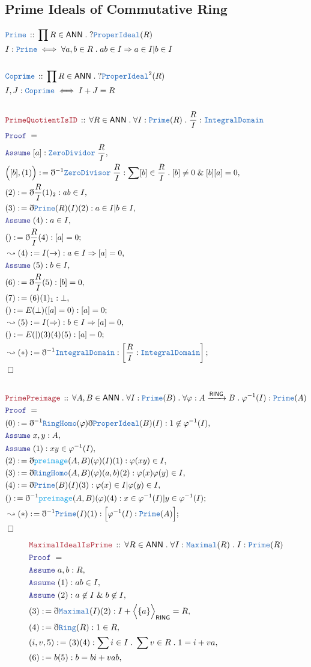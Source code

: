 \documentclass[12pt]{scrartcl}
\newcommand{\TYPE}[1]{\textcolor{NavyBlue}{\mathtt{#1}}}
\newcommand{\FUNC}[1]{\textcolor{Cerulean}{\mathtt{#1}}}
\newcommand{\LOGIC}[1]{\textcolor{Blue}{\mathtt{#1}}}
\newcommand{\THM}[1]{\textcolor{Maroon}{\mathtt{#1}}}
\renewcommand{\.}{\; . \;}
\newcommand{\de}{: \kern 0.1pc =}
\newcommand{\Theorem}[2]{& \THM{#1} \, :: \, #2 \\ & \Proof = \\ }
\newcommand{\DeclareType}[2]{& \TYPE{#1} \, :: \, #2 \\}
\newcommand{\DefineType}[3]{& #1 : \TYPE{#2} \iff #3 \\}
\newcommand{\Page}[1]{ \begin{align*} #1 \end{align*}   }
\newcommand{ \bd }{ \ByDef }
\renewcommand{\And}{\; \& \;}
\newcommand{\Say}[3]{& #1 \de #2 : #3, \\}
\newcommand{\Conclude}[3]{& #1 \de #2 : #3; \\}
\newcommand{\Derive}[3]{& \leadsto #1 \de #2 : #3, \\}
\newcommand{\DeriveConclude}[3]{& \leadsto #1 \de #2 : #3 ; \\}
\newcommand{\Assume}[2]{& \LOGIC{Assume} \; #1 : #2, \\}
\newcommand{\QED}{\; \square}
\newcommand{\EndProof}{& \QED \\}
\newcommand{\ByDef}{\eth}
\newcommand{\Proof}{\LOGIC{Proof} \; }
\newcommand{\Arrow}[1]{\xrightarrow{#1}}
\newcommand{\ID}{\TYPE{IntegralDomain}}
\newcommand{\RING}{\mathsf{RING}}
\newcommand{\ANN}{\mathsf{ANN}}
\begin{document}
\subsection{Prime Ideals of Commutative Ring}
\Page{
	\DeclareType{Prime}{\prod R \in \ANN \. ?\TYPE{ProperIdeal}(R)}
	\DefineType{I}{Prime}{\forall a,b \in R \. ab \in I \Rightarrow a \in I | b \in I}
	\\
	\DeclareType{Coprime}{\prod R \in \ANN \. ?\TYPE{ProperIdeal}^2(R)}
	\DefineType{I,J}{Coprime}{I + J = R} 	
	\\
	\Theorem{PrimeQuotientIsID}{\forall R \in \ANN \. \forall I : \TYPE{Prime}(R) \. \frac{R}{I} : \ID  }
	\Assume{[a]}{\TYPE{ZeroDividor} \; \frac{R}{I}}
	\Say{\Big([b],(1)\Big)}{ \bd^{-1}\TYPE{ZeroDivisor} \; \frac{R}{I}  }{\sum [b] \in \frac{R}{I} \.  [b] \neq 0 \And [b][a] = 0  }
	\Say{(2)}{ \bd \frac{R}{I} (1)_2 }{  ab \in I  }
	\Say{(3)}{ \bd \TYPE{Prime}(R)(I)(2) }{a \in I | b \in I}
	\Assume{(4)}{a \in I}
	\Conclude{()}{\bd \frac{R}{I}(4)}{[a] = 0}
	\Derive{(4)}{I(\rightarrow)}{a \in I \Rightarrow [a] = 0}
	\Assume{(5)}{b \in I}
	\Say{(6)}{ \bd \frac{R}{I}(5) }{[b] = 0}
	\Say{(7)}{(6)(1)_1}{\bot}
	\Conclude{()}{E(\bot)([a] = 0)}{[a] = 0}
	\Derive{(5)}{I(\Rightarrow)}{b \in I \Rightarrow [a] = 0  }
	\Conclude{()}{E(|)(3)(4)(5)}{[a] = 0 }
	\DeriveConclude{(*)}{\bd^{-1} \ID}{ \left[ \frac{R}{I} : \ID \right] }
	\EndProof
	\\
	\Theorem{PrimePreimage}{\forall A,B \in \ANN \. \forall I : \TYPE{Prime}(B) \. \forall \varphi : A \Arrow{\RING} B \. \varphi^{-1}(I) : \TYPE{Prime}(A)}
	\Say{(0)}{\bd^{-1} \TYPE{RingHomo}(\varphi)\bd \TYPE{ProperIdeal}(B)(I)}{1 \not \in \varphi^{-1}(I)}
	\Assume{x,y}{A}
	\Assume{(1)}{xy \in \varphi^{-1}(I)}
	\Say{(2)}{\bd \FUNC{preimage}(A,B)(\varphi)(I)(1)}{\varphi(xy) \in I}
	\Say{(3)}{\bd \TYPE{RingHomo}(A,B)(\varphi)(a,b)(2)}{\varphi(x)\varphi(y) \in I}
	\Say{(4)}{\bd \TYPE{Prime}(B)(I)(3)}{\varphi(x) \in I | \varphi(y) \in I}
	\Conclude{()}{\bd^{-1} \FUNC{preimage}(A,B)(\varphi)(4)}{x \in \varphi^{-1}(I) | y \in \varphi^{-1}(I)}
	\DeriveConclude{(*)}{\bd^{-1}\TYPE{Prime}(I)(1)}{\Big[\varphi^{-1}(I) : \TYPE{Prime}(A)\Big]}
	\EndProof
}\Page{
	\Theorem{MaximalIdealIsPrime}{  \forall R \in \ANN \. \forall I : \TYPE{Maximal}(R) \. I : \TYPE{Prime}(R)   }
	\Assume{a,b}{R}
	\Assume{(1)}{ab \in I}
	\Assume{(2)}{a \not \in I \And b \not \in I}
	\Say{(3)}{\bd \TYPE{Maximal}(I)(2)}{ I + \Big\langle \{ a \} \Big\rangle_{\RING} = R }
	\Say{(4)}{\bd \TYPE{Ring}(R)}{1 \in R}
	\Say{(i,v,5)}{(3)(4)}{\sum i \in I \. \sum v \in R \. 1 = i + va}
	\Say{(6)}{b(5)}{b = bi + vab}
}
\end{document}

